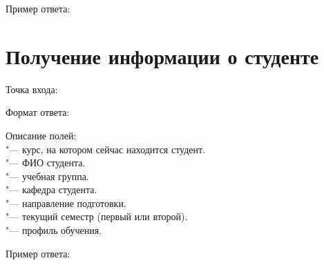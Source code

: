Пример ответа:
\begin{listing}[H]
\end{listing}
\vspace{-0.75cm}

\section{Получение информации о студенте}
\label{sec:student}

Точка входа: 

Формат ответа:
\begin{listing}[H]
\end{listing}
\vspace{-0.75cm}

Описание полей:\\
 "--- курс, на котором сейчас находится студент.\\
 "--- ФИО студента.\\
 "--- учебная группа.\\
 "--- кафедра студента.\\
 "--- направление подготовки.\\
 "--- текущий семестр (первый или второй).\\
 "--- профиль обучения.

Пример ответа:
\begin{listing}[H]
\end{listing}
\vspace{-0.75cm}
